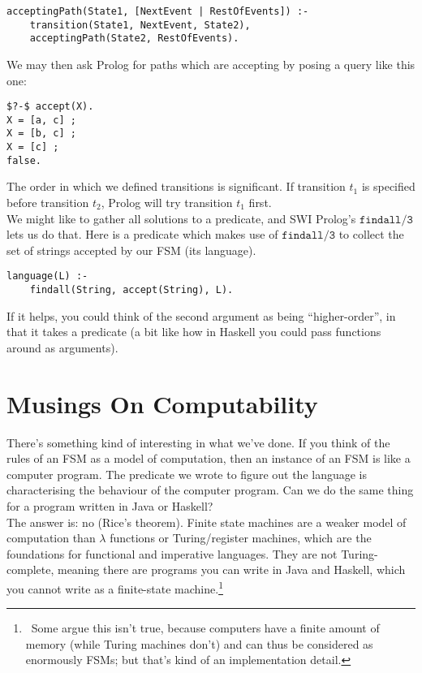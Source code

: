 \documentclass[a4paper,12pt]{article}
\newcommand{\kwa}[1]{\mathtt{#1}}
\begin{document}
\begin{lstlisting}
acceptingPath(State1, [NextEvent | RestOfEvents]) :-
    transition(State1, NextEvent, State2),
    acceptingPath(State2, RestOfEvents).
\end{lstlisting}

\noindent
We may then ask Prolog for paths which are accepting by posing a query like this one:

\begin{lstlisting}
$?-$ accept(X).
X = [a, c] ;
X = [b, c] ;
X = [c] ;
false.
\end{lstlisting}

\noindent
The order in which we defined transitions is significant. If transition $t_1$ is specified before transition $t_2$, Prolog will try transition $t_1$ first.\\

\noindent
We might like to gather all solutions to a predicate, and SWI Prolog's $\kwa{findall \slash 3}$ lets us do that. Here is a predicate which makes use of $\kwa{findall \slash 3}$ to collect the set of strings accepted by our FSM (its language).

\begin{lstlisting}
language(L) :-
    findall(String, accept(String), L).
\end{lstlisting}

\noindent
If it helps, you could think of the second argument as being ``higher-order'', in that it takes a predicate (a bit like how in Haskell you could pass functions around as arguments). \\


\section{Musings On Computability}

\noindent
There's something kind of interesting in what we've done. If you think of the rules of an FSM as a model of computation, then an instance of an FSM is like a computer program. The predicate we wrote to figure out the language is characterising the behaviour of the computer program. Can we do the same thing for a program written in Java or Haskell? \\

\noindent
The answer is: no (Rice's theorem). Finite state machines are a weaker model of computation than $\lambda$ functions or Turing/register machines, which are the foundations for functional and imperative languages. They are not Turing-complete, meaning there are programs you can write in Java and Haskell, which you cannot write as a finite-state machine.\footnote{~Some argue this isn't true, because computers have a finite amount of memory (while Turing machines don't) and can thus be considered as enormously FSMs; but that's kind of an implementation detail.} \\
\end{document}
